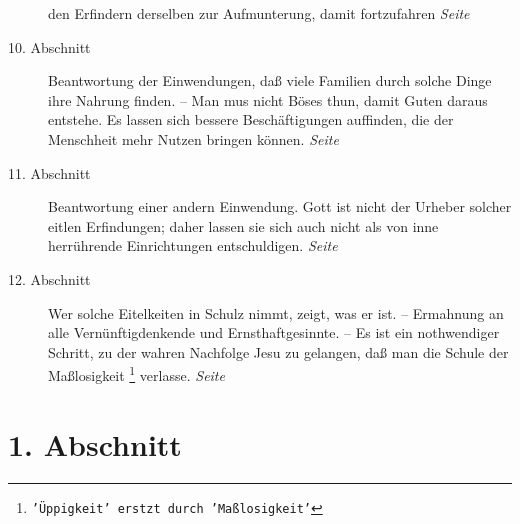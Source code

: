 \begin{description}
den Erfindern derselben zur Aufmunterung, damit fortzufahren
\dotfill \textit{Seite \pageref{kap17_ab9}}\\
\item[10. Abschnitt] Beantwortung der Einwendungen, daß viele Familien durch
solche Dinge ihre Nahrung finden. -- Man mus nicht Böses thun, damit Guten
daraus entstehe. Es lassen sich bessere Beschäftigungen auffinden, die der
Menschheit mehr Nutzen bringen können.
\dotfill \textit{Seite \pageref{kap17_ab10}}\\
\item[11. Abschnitt] Beantwortung einer andern Einwendung. Gott ist nicht der
Urheber solcher eitlen Erfindungen; daher lassen sie sich auch nicht als von
inne herrührende Einrichtungen entschuldigen.
\dotfill \textit{Seite \pageref{kap17_ab11}}\\
\item[12. Abschnitt] Wer solche Eitelkeiten in Schulz nimmt, zeigt, was er ist.
-- Ermahnung an alle Vernünftigdenkende und Ernsthaftgesinnte. -- Es ist ein
nothwendiger Schritt, zu der wahren Nachfolge Jesu zu gelangen, daß man die
Schule der Maßlosigkeit
\footnote{\texttt{'Üppigkeit' erstzt durch 'Maßlosigkeit'}}
verlasse.
\dotfill \textit{Seite \pageref{kap17_ab12}}\\

\end{description}

\newpage

\section{1. Abschnitt} \label{kap17_ab1}

